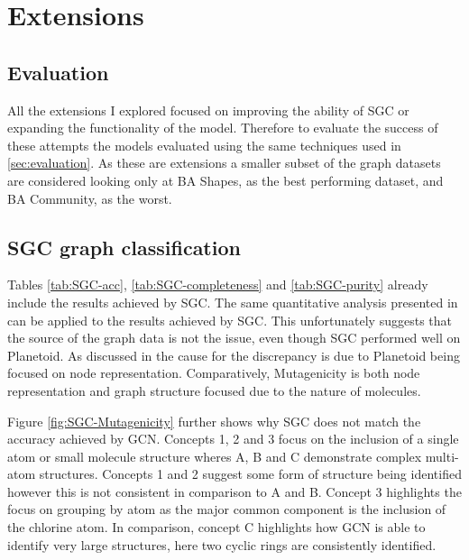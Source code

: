 \section{Extensions}
\label{sec:extension-eval}
\subsection{Evaluation}
All the extensions I explored focused on improving the ability of SGC or expanding the functionality of the model.
Therefore to evaluate the success of these attempts the models evaluated using the same techniques used in \ref{sec:evaluation}.
As these are extensions a smaller subset of the graph datasets are considered looking only at BA Shapes, as the best performing dataset, and BA Community, as the worst.

\subsection{SGC graph classification}
\label{SGC-graph}

Tables \ref{tab:SGC-acc}, \ref{tab:SGC-completeness} and \ref{tab:SGC-purity} already include the results achieved by SGC.
The same quantitative analysis presented in  can be applied to the results achieved by SGC.
This unfortunately suggests that the source of the graph data is not the issue, even though SGC performed well on Planetoid\cite{Fey/Lenssen/2019}.
As discussed in  the cause for the discrepancy is due to Planetoid\cite{Fey/Lenssen/2019} being focused on node representation.
Comparatively, Mutagenicity is both node representation and graph structure focused due to the nature of molecules.

Figure \ref{fig:SGC-Mutagenicity} further shows why SGC does not match the accuracy achieved by GCN.
Concepts 1, 2 and 3 focus on the inclusion of a single atom or small molecule structure wheres A, B and C demonstrate complex multi-atom structures.
Concepts 1 and 2 suggest some form of structure being identified however this is not consistent in comparison to A and B.
Concept 3 highlights the focus on grouping by atom as the major common component is the inclusion of the chlorine atom.
In comparison, concept C highlights how GCN is able to identify very large structures, here two cyclic rings are consistently identified.

